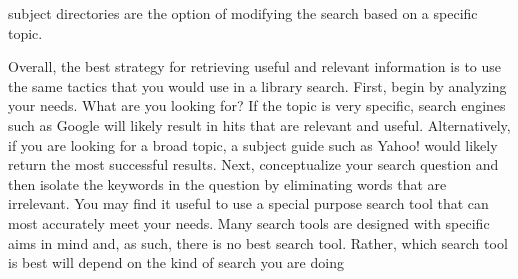 \documentclass [12pt]{beamer}
\begin{document}
\begin{frame}

subject directories are the option of modifying the search based on a specific topic.

	
Overall, the best strategy for retrieving useful and relevant information is to use the same tactics that you would use in a library search. First, begin by analyzing your needs. What are you looking for? If the topic is very specific, search engines such as Google will likely result in hits that are relevant and useful. Alternatively, if you are looking for a broad topic, a subject guide such as Yahoo! would likely return the most successful results. Next, conceptualize your search question and then isolate the keywords in the question by eliminating words that are irrelevant.  You may find it useful to use a special purpose search tool that can most accurately meet your needs. Many search tools are designed with specific aims in mind and, as such, there is no best search tool. Rather, which search tool is best will depend on the kind of search you are doing

\end{frame}
\end{document}
